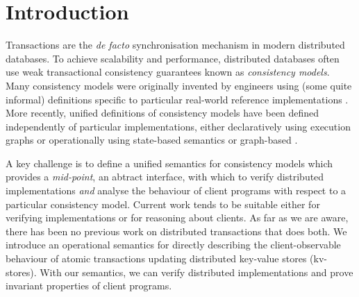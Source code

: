 \section{Introduction}
\label{sec:intro}

Transactions are the \emph{de facto} synchronisation mechanism in
modern distributed databases. To achieve scalability and performance,
distributed databases often use weak transactional consistency
guarantees known as \emph{consistency models}.  Many consistency
models were originally invented by engineers using (some quite
informal) definitions specific to particular real-world reference
implementations
\cite{gdur,ramp,CORFU,tango,si,distrsi,clocksi,redblue,rola,cops,PSI-RA,NMSI,PSI,wren}.
More recently, unified definitions of consistency models have been
defined independently of particular implementations, either
declaratively using execution graphs \cite{adya,ev_transactions} or
operationally using state-based semantics or graph-based \cite{seebelieve,alonetogether,sureshConcur}.

A key challenge is to define a unified semantics for consistency
models which provides a \emph{mid-point}, an abtract interface, with which to 
verify distributed implementations \emph{and} analyse the
behaviour of client programs with respect to a particular consistency model. Current
work tends to be suitable  either for verifying implementations or for reasoning
about clients. As far as we are aware, there has been no
previous work on distributed transactions that does both. 
We introduce an operational semantics for directly describing the
client-observable behaviour of atomic transactions 
updating distributed key-value stores (kv-stores).
With our semantics, we can verify distributed implementations and prove
invariant properties of client programs.  

